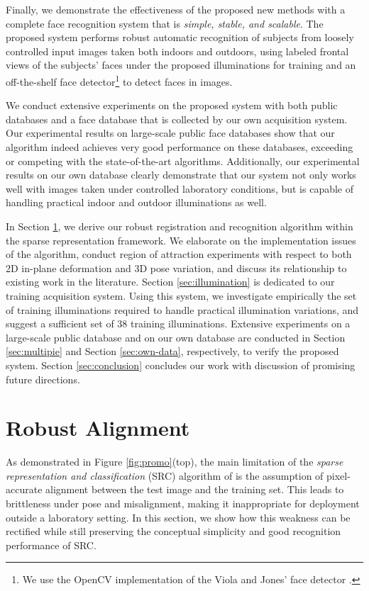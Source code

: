 \documentclass[12pt,journal,draftcls,letterpaper,onecolumn]{IEEEtran}
\begin{document}
Finally, we demonstrate the effectiveness of the proposed new
methods with a complete face recognition system that is {\em
simple, stable, and scalable}. The proposed system performs
robust automatic recognition of subjects from loosely
controlled input images taken both indoors and outdoors, using
labeled frontal views of the subjects' faces under the proposed
illuminations for training and an off-the-shelf face
detector\footnote{We use the OpenCV
implementation of the Viola and Jones' face detector
\cite{Viola2004-IJCV}.} to detect faces in images.

We conduct extensive experiments on the proposed system with
both public databases and a face database that is collected by
our own acquisition system. Our experimental results on
large-scale public face databases show that our algorithm
indeed achieves very good performance on these databases,
exceeding or competing with the state-of-the-art algorithms. 
Additionally, our experimental results on our own database
clearly demonstrate that our system not only works well with
images taken under controlled laboratory conditions, but is
capable of handling practical indoor and outdoor illuminations as well.

 In Section
\ref{sec:registration}, we derive our robust registration and
recognition algorithm within the sparse representation
framework. We elaborate on the implementation issues of the
algorithm, conduct region of attraction experiments with
respect to both 2D in-plane deformation and 3D pose variation,
and discuss its relationship to existing work in the
literature. Section \ref{sec:illumination} is dedicated to our
training acquisition system. Using this system, we investigate empirically the set of training illuminations required to handle practical illumination variations, and suggest a sufficient set of 38 training illuminations. Extensive experiments on
a large-scale public database and on our own database are conducted
in Section \ref{sec:multipie} and Section \ref{sec:own-data},
respectively, to verify the proposed system. Section
\ref{sec:conclusion} concludes our work with discussion of
promising future directions.

\section{Robust Alignment}\label{sec:registration}
As demonstrated in Figure \ref{fig:promo}(top), the main
limitation of the {\em sparse representation and
classification} (SRC) algorithm of \cite{Wright2009-PAMI} is
the assumption of pixel-accurate alignment between the test
image and the training set. This leads to brittleness under
pose and misalignment, making it inappropriate for deployment
outside a laboratory setting. In this section, we show how this
weakness can be rectified while still preserving the conceptual
simplicity and good recognition performance of SRC.
\end{document}

